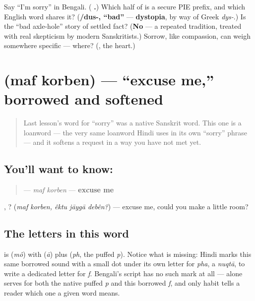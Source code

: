 \begin{tcolorbox}[breakable,colback=teal!4,colframe=teal!35!black,title={Before you move on}]
Say \textquotedblleft{}I'm sorry\textquotedblright{} in Bengali. (\textbf{ .}) Which half of  is a secure PIE prefix, and which English word shares it? (\textbf{/dus-, \textquotedblleft{}bad\textquotedblright{}} — \textbf{dystopia}, by way of Greek \emph{dys-}.) Is the \textquotedblleft{}bad axle-hole\textquotedblright{} story of  settled fact? (\textbf{No} — a repeated tradition, treated with real skepticism by modern Sanskritists.) Sorrow, like compassion, can weigh somewhere specific — where? (\textbf{}, the heart.)
\end{tcolorbox}
\section[maf korben]{  (maf korben) — \textquotedblleft{}excuse me,\textquotedblright{} borrowed and softened}

\label{lesson:BN-C13-maf-korben}



\begin{quote}
Last lesson's word for \textquotedblleft{}sorry\textquotedblright{} was a native Sanskrit word. This one is a loanword — the very same loanword Hindi uses in its own \textquotedblleft{}sorry\textquotedblright{} phrase — and it softens a request in a way you have not met yet.
\end{quote}

\subsection*{You'll want to know:  }
\begin{quote}
\textbf{ } — \emph{maf korben} — \textbf{excuse me}
\end{quote}

 ,   ? (\emph{maf korben, êktu jāygā debên?}) — excuse me, could you make a little room?

\subsection*{The letters in this word}
\textbf{} is \textbf{} (\emph{mô}) with \textbf{} (\emph{ā}) plus \textbf{} (\emph{ph}, the puffed \emph{p}). Notice what is missing: Hindi marks this same borrowed sound with a small dot under its own letter for \emph{pha}, a \emph{nuqtā}, to write a dedicated letter for \emph{f}. Bengali's script has no such mark at all — \textbf{} alone serves for both the native puffed \emph{p} and this borrowed \emph{f}, and only habit tells a reader which one a given word means.

